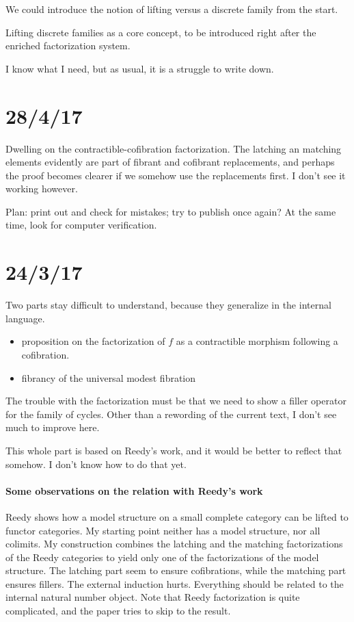 \documentclass[csh.tex]{subfiles}
\begin{document}
We could introduce the notion of lifting versus a discrete family from the start. 

Lifting discrete families as a core concept, to be introduced right after the enriched factorization system.

I know what I need, but as usual, it is a struggle to write down.

\section{28/4/17}
Dwelling on the contractible-cofibration factorization. The latching an matching elements evidently are part of fibrant and cofibrant replacements, and perhaps the proof becomes clearer if we somehow use the replacements first. I don't see it working however.

Plan: print out and check for mistakes; try to publish once again? At the same time, look for computer verification.


\section{24/3/17}
Two parts stay difficult to understand, because they generalize in the internal language.
\begin{itemize}
\item proposition on the factorization of $f$ as a contractible morphism following a cofibration.
\item fibrancy of the universal modest fibration
\end{itemize}

The trouble with the factorization must be that we need to show a filler operator for the family of cycles. Other than a rewording of the current text, I don't see much to improve here.

This whole part is based on Reedy's work, and it would be better to reflect that somehow.
I don't know how to do that yet.

\paragraph{Some observations on the relation with Reedy's work}
Reedy shows how a model structure on a small complete category can be lifted to functor categories. My starting point neither has a model structure, nor all colimits.
My construction combines the latching and the matching factorizations of the Reedy categories to yield only one of the factorizations of the model structure.
The latching part seem to ensure cofibrations, while the matching part ensures fillers.
The external induction hurts. Everything should be related to the internal natural number object.
Note that Reedy factorization is quite complicated, and the paper tries to skip to the result.
\end{document}
